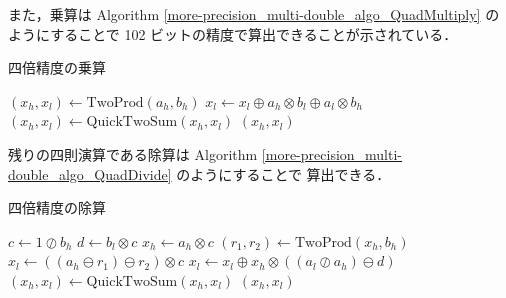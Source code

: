 また，乗算は
Algorithm \ref{more-precision_multi-double_algo_QuadMultiply} のようにすることで
102 ビットの精度で算出できることが示されている\cite{Naoya2012}．

\begin{algorithm}[tp]
    \caption{四倍精度の乗算\cite{Hisashi2006,Naoya2012}}
    \label{more-precision_multi-double_algo_QuadMultiply}
    \begin{algorithmic}
        \State $(x_h, x_l) \gets \text{TwoProd}(a_h, b_h)$
        \State $x_l \gets x_l \oplus a_h \otimes b_l \oplus a_l \otimes b_h$
        \State $(x_h, x_l) \gets \text{QuickTwoSum}(x_h, x_l)$
        \State \Return $(x_h, x_l)$
        \EndProcedure
    \end{algorithmic}
\end{algorithm}

残りの四則演算である除算は
Algorithm \ref{more-precision_multi-double_algo_QuadDivide} のようにすることで
算出できる\cite{Naoya2012s}．

\begin{algorithm}[tp]
    \caption{四倍精度の除算\cite{Naoya2012s}}
    \label{more-precision_multi-double_algo_QuadDivide}
    \begin{algorithmic}
        \State $c \gets 1 \oslash b_h$
        \State $d \gets b_l \otimes c$
        \State $x_h \gets a_h \otimes c$
        \State $(r_1, r_2) \gets \text{TwoProd}(x_h, b_h)$
        \State $x_l \gets ((a_h \ominus r_1) \ominus r_2) \otimes c$
        \State $x_l \gets x_l \oplus x_h \otimes ((a_l \oslash a_h) \ominus d)$
        \State $(x_h, x_l) \gets \text{QuickTwoSum}(x_h, x_l)$
        \State \Return $(x_h, x_l)$
        \EndProcedure
    \end{algorithmic}
\end{algorithm}
